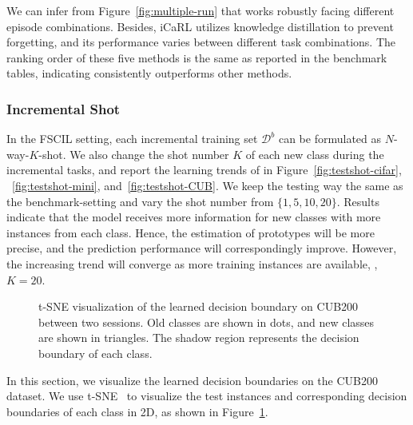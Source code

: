 We can infer from Figure~\ref{fig:multiple-run} that \name works robustly facing different episode combinations. Besides, iCaRL utilizes knowledge distillation to prevent forgetting, and its performance varies between different task combinations. The ranking order of these five methods is the same as reported in the benchmark tables, indicating \name consistently outperforms other methods.

\subsubsection{Incremental Shot}
In the FSCIL setting, each incremental training set $\mathcal{D}^b$ can be formulated as $N$-way-$K$-shot.
We also change the shot number $K$  of each new class during the incremental tasks, and report the learning trends of \name in Figure~\ref{fig:testshot-cifar}, ~\ref{fig:testshot-mini}, and~\ref{fig:testshot-CUB}. 
 We keep the testing way the same as the benchmark-setting and vary the shot number from $\{1, 5, 10,  20\}$.
Results indicate that the model receives more information for new classes with more instances from each class. 
 Hence, the estimation of prototypes will be more precise, and the prediction performance will correspondingly improve. However, the increasing trend will converge as more training instances are available, \eg, $K=20$.



\begin{figure}[t]
	\begin{center}
		
	\end{center}
	\caption{ t-SNE visualization of the learned decision boundary on CUB200 between two sessions. Old classes are shown in dots, and new classes are shown in triangles. The shadow region represents the decision boundary of each class. 
	} \label{figure:tsne}
\end{figure}


In this section, we visualize the learned decision boundaries on the CUB200 dataset.  We use t-SNE~\cite{van2008visualizing} to visualize the test instances and corresponding decision boundaries of each class in 2D, as shown in Figure~\ref{figure:tsne}. 

